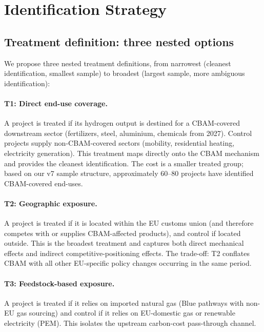 \documentclass[11pt,a4paper]{article}
\begin{document}
\section{Identification Strategy}
\label{sec:ch8-identification}

\subsection{Treatment definition: three nested options}

We propose three nested treatment definitions, from narrowest (cleanest identification, smallest sample) to broadest (largest sample, more ambiguous identification):

\paragraph{T1: Direct end-use coverage.} A project is treated if its hydrogen output is destined for a CBAM-covered downstream sector (fertilizers, steel, aluminium, chemicals from 2027). Control projects supply non-CBAM-covered sectors (mobility, residential heating, electricity generation). This treatment maps directly onto the CBAM mechanism and provides the cleanest identification. The cost is a smaller treated group; based on our v7 sample structure, approximately 60--80 projects have identified CBAM-covered end-uses.

\paragraph{T2: Geographic exposure.} A project is treated if it is located within the EU customs union (and therefore competes with or supplies CBAM-affected products), and control if located outside. This is the broadest treatment and captures both direct mechanical effects and indirect competitive-positioning effects. The trade-off: T2 conflates CBAM with all other EU-specific policy changes occurring in the same period.

\paragraph{T3: Feedstock-based exposure.} A project is treated if it relies on imported natural gas (Blue pathways with non-EU gas sourcing) and control if it relies on EU-domestic gas or renewable electricity (PEM). This isolates the upstream carbon-cost pass-through channel.
\end{document}
